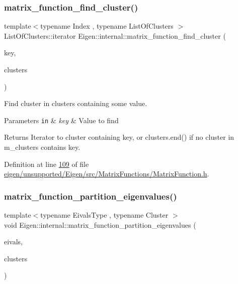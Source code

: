 \subsubsection{\texorpdfstring{matrix\+\_\+function\+\_\+find\+\_\+cluster()}{matrix\_function\_find\_cluster()}}
{\footnotesize\ttfamily template$<$typename Index , typename List\+Of\+Clusters $>$ \\
List\+Of\+Clusters\+::iterator Eigen\+::internal\+::matrix\+\_\+function\+\_\+find\+\_\+cluster (\begin{DoxyParamCaption}\item[{\hyperlink{namespace_eigen_a62e77e0933482dafde8fe197d9a2cfde}{Index}}]{key,  }\item[{List\+Of\+Clusters \&}]{clusters }\end{DoxyParamCaption})}



Find cluster in {\ttfamily clusters} containing some value. 


\begin{DoxyParams}[1]{Parameters}
\mbox{\tt in}  & {\em key} & Value to find \\
\hline
\end{DoxyParams}
\begin{DoxyReturn}{Returns}
Iterator to cluster containing {\ttfamily key}, or {\ttfamily clusters.\+end()} if no cluster in {\ttfamily m\+\_\+clusters} contains {\ttfamily key}. 
\end{DoxyReturn}


Definition at line \hyperlink{eigen_2unsupported_2_eigen_2src_2_matrix_functions_2_matrix_function_8h_source_l00109}{109} of file \hyperlink{eigen_2unsupported_2_eigen_2src_2_matrix_functions_2_matrix_function_8h_source}{eigen/unsupported/\+Eigen/src/\+Matrix\+Functions/\+Matrix\+Function.\+h}.

\mbox{\label{namespace_eigen_1_1internal_a9291a6ab4fe0ad1346049a8f2feddeaa}} 
\subsubsection{\texorpdfstring{matrix\+\_\+function\+\_\+partition\+\_\+eigenvalues()}{matrix\_function\_partition\_eigenvalues()}}
{\footnotesize\ttfamily template$<$typename Eivals\+Type , typename Cluster $>$ \\
void Eigen\+::internal\+::matrix\+\_\+function\+\_\+partition\+\_\+eigenvalues (\begin{DoxyParamCaption}\item[{const Eivals\+Type \&}]{eivals,  }\item[{std\+::list$<$ Cluster $>$ \&}]{clusters }\end{DoxyParamCaption})}



